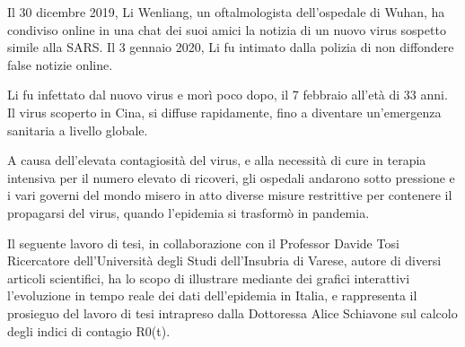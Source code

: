 
Il 30 dicembre 2019, Li Wenliang, un oftalmologista dell’ospedale di Wuhan, ha condiviso online in una chat dei suoi amici la notizia di un nuovo virus sospetto simile alla SARS.
Il 3 gennaio 2020, Li fu intimato dalla polizia di non diffondere false notizie online.

Li fu infettato dal nuovo virus e morì poco dopo, il 7 febbraio all’età di 33 anni.
Il virus scoperto in Cina, si diffuse rapidamente, fino a diventare un'emergenza sanitaria a livello globale.

A causa dell’elevata contagiosità del virus, e alla necessità di cure in terapia intensiva per il numero elevato di ricoveri, gli ospedali andarono sotto pressione e i vari governi del mondo misero in atto diverse misure restrittive per contenere il propagarsi del virus, quando l'epidemia si trasformò in pandemia.

Il seguente lavoro di tesi, in collaborazione con il Professor Davide Tosi Ricercatore dell’Università degli Studi dell’Insubria di Varese, autore di diversi articoli scientifici\cite{tosi_1}\cite{tosi_2}\cite{tosi_3}, ha lo scopo di illustrare mediante dei grafici interattivi l’evoluzione in tempo reale dei dati dell’epidemia in Italia, e rappresenta il prosieguo del lavoro di tesi intrapreso dalla Dottoressa Alice Schiavone sul calcolo degli indici di contagio R0(t)\cite{schiavone_tesi}.